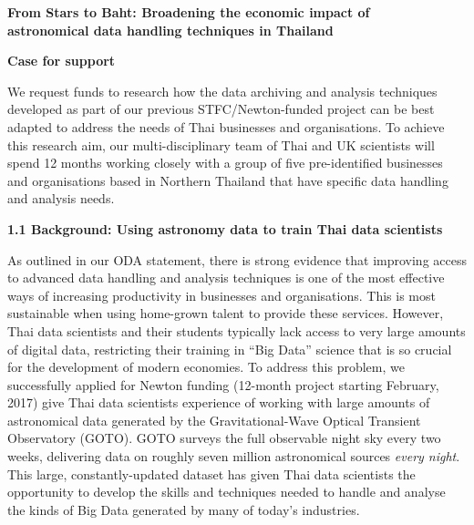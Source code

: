 \documentclass[11pt]{article}
\begin{document}
  \setcounter{figure}{0}
  \noindent
  {\LARGE \bf From Stars to Baht: Broadening the economic impact of \\
  astronomical data handling techniques in Thailand}
  
  \vspace{3mm}
  \noindent
  {\LARGE \bf Case for support}
  \vspace{3mm}
  
  \noindent
  We request funds to research how the data archiving and analysis techniques developed as part of our previous STFC/Newton-funded project can be best adapted to address the needs of Thai businesses and organisations. To achieve this research aim, our multi-disciplinary team of Thai and UK scientists will spend 12 months working closely with a group of five pre-identified businesses and organisations based in Northern Thailand that have specific data handling and analysis needs.
  
  \vspace{3mm}
  \noindent
  {\large \bf 1.1 Background: Using astronomy data to train Thai data scientists}
  
  \noindent
  As outlined in our ODA statement, there is strong evidence that improving access to advanced data handling and analysis techniques is one of the most effective ways of increasing productivity in businesses and organisations. This is most sustainable when using home-grown talent to provide these services. However, Thai data scientists and their students typically lack access to very large amounts of digital data, restricting their training in ``Big Data'' science that is so crucial for the development of modern economies. To address this problem, we successfully applied for Newton funding (12-month project starting February, 2017) give Thai data scientists experience of working with large amounts of astronomical data generated by the Gravitational-Wave Optical Transient Observatory (GOTO). GOTO surveys the full observable night sky every two weeks, delivering data on roughly seven million astronomical sources {\it every night}. This large, constantly-updated dataset has given Thai data scientists the opportunity to develop the skills and techniques needed to handle and analyse the kinds of Big Data generated by many of today's industries.
  
\end{document}
